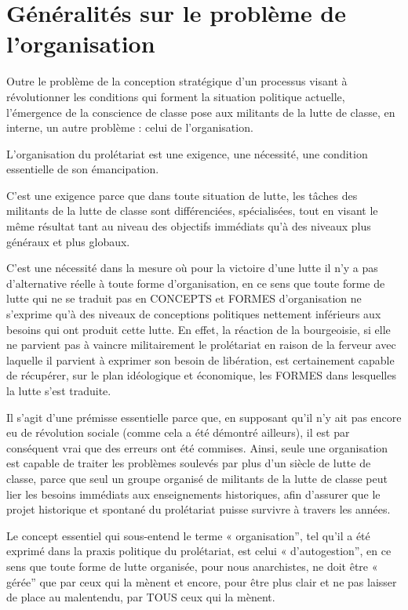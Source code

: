 \chapter{Généralités sur le problème de l'organisation}\hypertarget{gnralits-sur-le-problme-de-lorganisation}{}\label{gnralits-sur-le-problme-de-lorganisation}

Outre le problème de la conception stratégique d'un processus visant à révolutionner les conditions qui forment la situation politique actuelle, l'émergence de la conscience de classe pose aux militants de la lutte de classe, en interne, un autre problème : celui de l'organisation.

L'organisation du prolétariat est une exigence, une nécessité, une condition essentielle de son émancipation.

C'est une exigence parce que dans toute situation de lutte, les tâches des militants de la lutte de classe sont différenciées, spécialisées, tout en visant le même résultat tant au niveau des objectifs immédiats qu'à des niveaux plus généraux et plus globaux.

C'est une nécessité dans la mesure où pour la victoire d'une lutte il n'y a pas d'alternative réelle à toute forme d'organisation, en ce sens que toute forme de lutte qui ne se traduit pas en CONCEPTS et FORMES d'organisation ne s'exprime qu'à des niveaux de conceptions politiques nettement inférieurs aux besoins qui ont produit cette lutte. En effet, la réaction de la bourgeoisie, si elle ne parvient pas à vaincre militairement le prolétariat en raison de la ferveur avec laquelle il parvient à exprimer son besoin de libération, est certainement capable de récupérer, sur le plan idéologique et économique, les FORMES dans lesquelles la lutte s'est traduite.

Il s'agit d'une prémisse essentielle parce que, en supposant qu'il n'y ait pas encore eu de révolution sociale (comme cela a été démontré ailleurs), il est par conséquent vrai que des erreurs ont été commises. Ainsi, seule une organisation est capable de traiter les problèmes soulevés par plus d'un siècle de lutte de classe, parce que seul un groupe organisé de militants de la lutte de classe peut lier les besoins immédiats aux enseignements historiques, afin d'assurer que le projet historique et spontané du prolétariat puisse survivre à travers les années.

Le concept essentiel qui sous-entend le terme « organisation'', tel qu'il a été exprimé dans la praxis politique du prolétariat, est celui « d'autogestion'', en ce sens que toute forme de lutte organisée, pour nous anarchistes, ne doit être « gérée'' que par ceux qui la mènent et encore, pour être plus clair et ne pas laisser de place au malentendu, par TOUS ceux qui la mènent.

